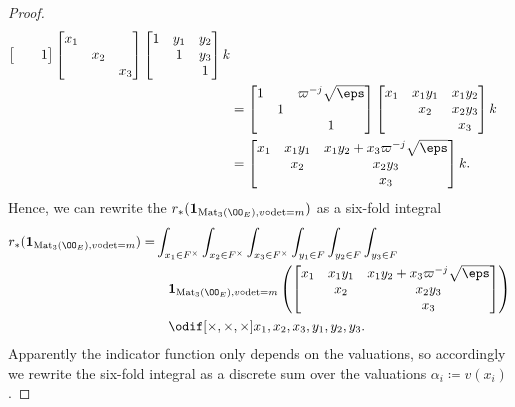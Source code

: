 \begin{proof}
\begin{align*}
\begin{bmatrix}
      &   & 1
    \end{bmatrix}
    \begin{bmatrix} x_1 \\ & x_2 \\ && x_3 \end{bmatrix}
    \begin{bmatrix} 1 & y_1 & y_2 \\ & 1 & y_3 \\ & & 1 \end{bmatrix} k \\
    &=
    \begin{bmatrix}
      1 &   & \varpi^{-j}\sqrt\eps \\
      & 1 \\
      &   & 1
    \end{bmatrix}
    \begin{bmatrix} x_1 & x_1 y_1 & x_1 y_2 \\ & x_2 & x_2 y_3 \\ & & x_3 \end{bmatrix} k \\
    &=
    \begin{bmatrix}
      x_1 & x_1 y_1 & x_1 y_2 + x_3 \varpi^{-j} \sqrt\eps \\
      & x_2 & x_2 y_3 \\
      & & x_3
    \end{bmatrix}
    k.
  \end{align*}
  Hence, we can rewrite the $r_\ast(\mathbf{1}_{\Mat_3(\OO_E), v\circ\det=m})$
  as a six-fold integral
  \begin{align*}
    r_\ast(\mathbf{1}_{\Mat_3(\OO_E), v\circ\det=m}) =
    & \int_{x_1 \in F^\times} \int_{x_2 \in F^\times} \int_{x_3 \in F^\times}
    \int_{y_1 \in F} \int_{y_2 \in F} \int_{y_3 \in F} \\
    &\quad \mathbf{1}_{\Mat_3(\OO_E), v\circ\det=m} \left(
    \begin{bmatrix}
      x_1 & x_1 y_1 & x_1 y_2 + x_3 \varpi^{-j} \sqrt\eps \\
      & x_2 & x_2 y_3 \\
      & & x_3
    \end{bmatrix}
    \right) \\
    &\quad \odif[{\times,\times,\times}]{x_1,x_2,x_3,y_1,y_2,y_3}.
  \end{align*}
  Apparently the indicator function only depends on the valuations,
  so accordingly we rewrite the six-fold integral as a discrete sum over the valuations
  $\alpha_i \coloneqq v(x_i)$.

\end{proof}
